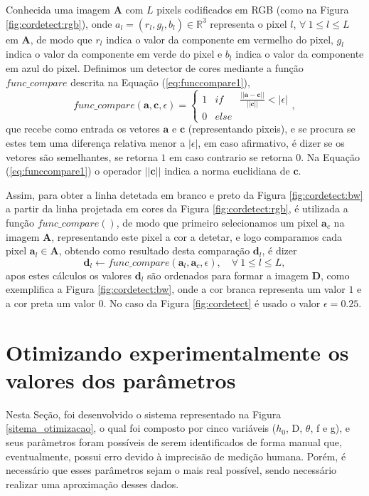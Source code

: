 \documentclass[a4paper, 12pt]{article}
\begin{document}
Conhecida uma imagem $\textbf{A}$ com $L$ pixels codificados 
em RGB (como na Figura \ref{fig:cordetect:rgb}), onde $a_l=(r_l,g_l,b_l)\in \mathbb{R}^3$
representa o pixel $l$, $\forall~1\leq l\leq L$ em $\textbf{A}$, 
de modo que
$r_l$ indica o valor da componente em vermelho do pixel,
$g_l$ indica o valor da componente em verde do pixel e
$b_l$ indica o valor da componente em azul do pixel.
Definimos um detector de cores mediante a função $func\_compare$ descrita na Equação (\ref{eq:funccompare1}),
\begin{equation}\label{eq:funccompare1}
func\_compare(\mathbf{a},\mathbf{c},\epsilon)=
\left\{
\begin{matrix}
1 & if   & \frac{||\mathbf{a}-\mathbf{c}||}{||\mathbf{c}||}<|\epsilon|\\
0 & else & ~
\end{matrix}
\right.,
\end{equation}
que recebe como entrada os vetores $\mathbf{a}$ e $\mathbf{c}$ 
(representando pixeis), e se procura se estes tem uma diferença relativa menor a $|\epsilon|$, 
em caso afirmativo, é dizer se os vetores são semelhantes, se retorna $1$ em caso contrario se retorna $0$.
Na Equação (\ref{eq:funccompare1}) o operador $||\mathbf{c}||$ indica a norma euclidiana de $\mathbf{c}$.


Assim, para obter a linha detetada em branco e preto da Figura \ref{fig:cordetect:bw} 
a partir da linha projetada em cores da Figura \ref{fig:cordetect:rgb}, 
é utilizada a função $func\_compare()$, de modo que primeiro selecionamos um pixel $\mathbf{a}_c$ na imagem $\mathbf{A}$,
representando este pixel a cor a detetar, e logo comparamos
cada pixel $\mathbf{a}_l \in \mathbf{A}$, obtendo como resultado desta comparação $\mathbf{d}_l$, é dizer
\begin{equation}\label{eq:funccompare2}
\mathbf{d}_l\leftarrow func\_compare(\mathbf{a}_l,\mathbf{a}_c,\epsilon),\quad \forall~ 1\leq l\leq L,
\end{equation}
apos estes cálculos os valores $\mathbf{d}_l$ são ordenados para formar a imagem $\mathbf{D}$, 
como exemplifica a Figura \ref{fig:cordetect:bw}, onde a cor branca representa um 
valor $1$ e a cor preta um valor $0$.
No caso da Figura \ref{fig:cordetect} é usado o valor $\epsilon=0.25$.



\section{Otimizando experimentalmente os valores dos parâmetros}
Nesta Seção, foi desenvolvido o sistema representado na Figura \ref{sitema_otimizacao}, o qual foi composto por cinco variáveis ($h_0$, D, $\theta$, f e g), e seus parâmetros foram possíveis de serem identificados de forma manual que, eventualmente, possui erro devido à imprecisão de medição humana. Porém, é necessário que esses parâmetros sejam o mais real possível, sendo necessário realizar uma aproximação desses dados.
\end{document}
